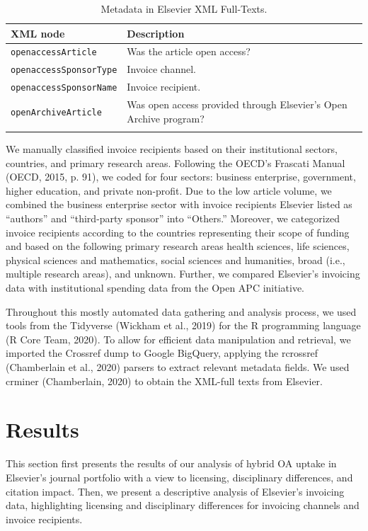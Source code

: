 \documentclass[a4paper,man,floatsintext,longtable,noextraspace,12pt]{apa6}
\begin{document}
\begin{table}[H]
\caption{\label{tab:els_xml}Metadata in Elsevier XML Full-Texts.}
\centering
\begin{tabular}[t]{lp{10cm}}
\toprule
XML node & Description\\
\midrule
\texttt{openaccessArticle} & Was the article open
access? \\
\texttt{openaccessSponsorType} & Invoice channel.\\
\texttt{openaccessSponsorName} & Invoice recipient.\\
\texttt{openArchiveArticle} & Was open access provided through
Elsevier's Open Archive program?\tabularnewline \\
\bottomrule
\end{tabular}
\end{table}

We manually classified invoice recipients based on their institutional
sectors, countries, and primary research areas. Following the OECD's
Frascati Manual (OECD, 2015, p. 91), we coded for four sectors: business
enterprise, government, higher education, and private non-profit. Due to
the low article volume, we combined the business enterprise sector with
invoice recipients Elsevier listed as ``authors'' and ``third-party
sponsor'' into ``Others.'' Moreover, we categorized invoice recipients
according to the countries representing their scope of funding and based
on the following primary research areas health sciences, life sciences,
physical sciences and mathematics, social sciences and humanities, broad
(i.e., multiple research areas), and unknown. Further, we compared
Elsevier's invoicing data with institutional spending data from the Open
APC initiative.

Throughout this mostly automated data gathering and analysis process, we
used tools from the Tidyverse (Wickham et al., 2019) for the R
programming language (R Core Team, 2020). To allow for efficient data
manipulation and retrieval, we imported the Crossref dump to Google
BigQuery, applying the rcrossref (Chamberlain et al., 2020) parsers to
extract relevant metadata fields. We used crminer (Chamberlain, 2020) to
obtain the XML-full texts from Elsevier.

\hypertarget{results}{%
\section*{Results}\label{results}}

This section first presents the results of our analysis of hybrid OA
uptake in Elsevier's journal portfolio with a view to licensing,
disciplinary differences, and citation impact. Then, we present a
descriptive analysis of Elsevier's invoicing data, highlighting
licensing and disciplinary differences for invoicing channels and
invoice recipients.
\end{document}
